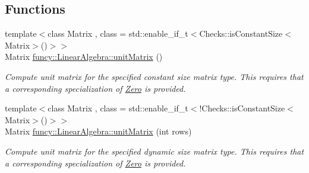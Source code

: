 \subsection*{Functions}
\begin{DoxyCompactItemize}
\item 
{\footnotesize template$<$class Matrix , class  = std\-::enable\-\_\-if\-\_\-t$<$\-Checks\-::is\-Constant\-Size$<$\-Matrix$>$()$>$$>$ }\\Matrix \hyperlink{group__LinearAlgebraGroup_ga04d388790cbcaac909faeb3b930c7ae7}{funcy\-::\-Linear\-Algebra\-::unit\-Matrix} ()
\begin{DoxyCompactList}\small\item\em Compute unit matrix for the specified constant size matrix type. This requires that a corresponding specialization of \hyperlink{structfuncy_1_1Zero}{Zero} is provided. \end{DoxyCompactList}\item 
{\footnotesize template$<$class Matrix , class  = std\-::enable\-\_\-if\-\_\-t$<$!\-Checks\-::is\-Constant\-Size$<$\-Matrix$>$()$>$$>$ }\\Matrix \hyperlink{group__LinearAlgebraGroup_gab4a999f99c90ece2b9319d28c213ed58}{funcy\-::\-Linear\-Algebra\-::unit\-Matrix} (int rows)
\begin{DoxyCompactList}\small\item\em Compute unit matrix for the specified dynamic size matrix type. This requires that a corresponding specialization of \hyperlink{structfuncy_1_1Zero}{Zero} is provided. \end{DoxyCompactList}\end{DoxyCompactItemize}
